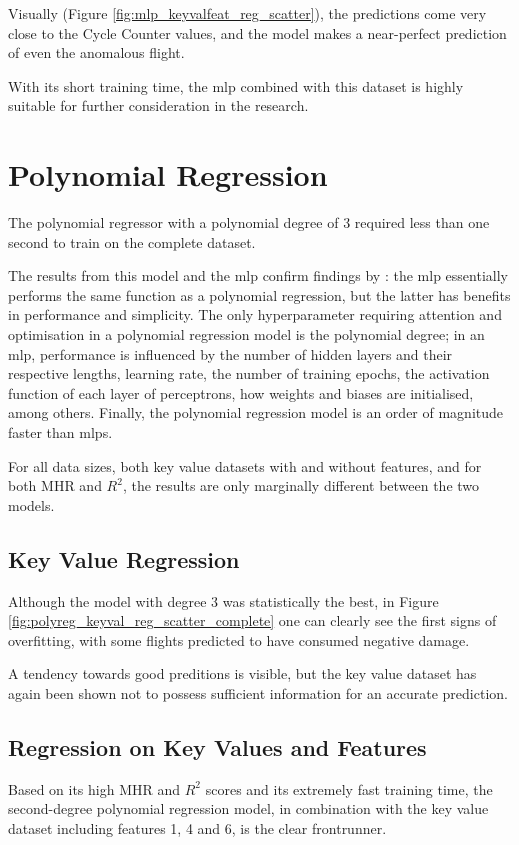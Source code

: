 Visually (Figure \ref{fig:mlp_keyvalfeat_reg_scatter}), the predictions come very close to the Cycle Counter values, and the model makes a near-perfect prediction of even the anomalous flight.

With its short training time, the \ac{mlp} combined with this dataset is highly suitable for further consideration in the research.

\section{Polynomial Regression}
The polynomial regressor with a polynomial degree of 3 required less than one second to train on the complete dataset.

The results from this model and the \ac{mlp} confirm findings by \citet[]{cheng_polynomial_2019}: the \ac{mlp} essentially performs the same function as a polynomial regression, but the latter has benefits in performance and simplicity. The only hyperparameter requiring attention and optimisation in a polynomial regression model is the polynomial degree; in an \ac{mlp}, performance is influenced by the number of hidden layers and their respective lengths, learning rate, the number of training epochs, the activation function of each layer of perceptrons, how weights and biases are initialised, among others. Finally, the polynomial regression model is an order of magnitude faster than \ac{mlp}s.

For all data sizes, both key value datasets with and without features, and for both MHR and \(R^2\), the results are only marginally different between the two models.

\subsection{Key Value Regression}
Although the model with degree 3 was statistically the best, in Figure \ref{fig:polyreg_keyval_reg_scatter_complete} one can clearly see the first signs of overfitting, with some flights predicted to have consumed negative damage.

A tendency towards good preditions is visible, but the key value dataset has again been shown not to possess sufficient information for an accurate prediction.

\subsection{Regression on Key Values and Features}
Based on its high MHR and \(R^2\) scores and its extremely fast training time, the second-degree polynomial regression model, in combination with the key value dataset including features 1, 4 and 6, is the clear frontrunner.

